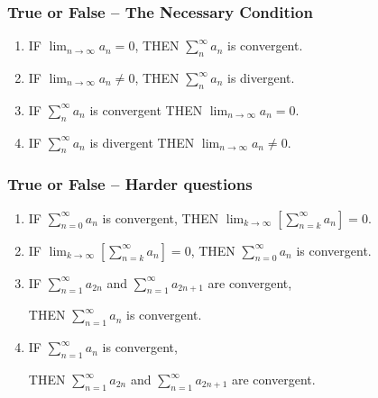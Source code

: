 \documentclass[14pt]{beamer}
\newcommand{\setsize}[1]{\fontsize{#1}{#1}\selectfont} %
\newcommand{\suman}{\sum_{n=0}^{\infty} a_n}
\newcommand{\vvv}{\vspace{.2cm}}
\begin{document}
	\begin{frame}[t]
		\frametitle{True or False -- The Necessary Condition}

		\begin{enumerate}
			\item IF ${\displaystyle \lim_{n \to \infty} a_n = 0}$, \quad THEN
				${\displaystyle \sum_{n}^{\infty} a_n}$ is convergent.
				\vfill

			\item IF ${\displaystyle \lim_{n \to \infty} a_n \neq 0}$, \quad THEN
				${\displaystyle \sum_{n}^{\infty} a_n}$ is divergent.
				\vfill

			\item IF ${\displaystyle \sum_{n}^{\infty} a_n}$ is convergent \quad THEN ${\displaystyle \lim_{n \to \infty} a_n = 0}$.
				\vfill

			\item IF ${\displaystyle \sum_{n}^{\infty} a_n}$ is divergent \quad THEN ${\displaystyle \lim_{n \to \infty} a_n \neq 0}$.
				\vfill
		\end{enumerate}
	\end{frame}
	\begin{frame}[t]
		\setsize{12}
		\frametitle{True or False -- Harder questions}
		\vspace{-.2cm}
		\begin{enumerate}
			\item IF ${\displaystyle \suman}$ is convergent, \quad THEN
				${\displaystyle \lim_{k \to \infty} \left[ \sum_{n=k}^{\infty} a_n \right] = 0}$.
				\vvv

			\item IF ${\displaystyle \lim_{k \to \infty} \left[ \sum_{n=k}^{\infty} a_n \right] = 0}$,
				\quad THEN ${\displaystyle \suman}$ is convergent. \vvv

			\item IF ${\displaystyle \sum_{n=1}^{\infty} a_{2n}}$ and ${\displaystyle \sum_{n=1}^{\infty} a_{2n+1}}$
				are convergent,

				THEN ${\displaystyle \sum_{n=1}^{\infty} a_n}$ is convergent. \vvv

			\item IF ${\displaystyle \sum_{n=1}^{\infty} a_n}$ is convergent,

				THEN ${\displaystyle \sum_{n=1}^{\infty} a_{2n}}$ and ${\displaystyle \sum_{n=1}^{\infty} a_{2n+1}}$
				are convergent.
		\end{enumerate}
	\end{frame}
\end{document}
